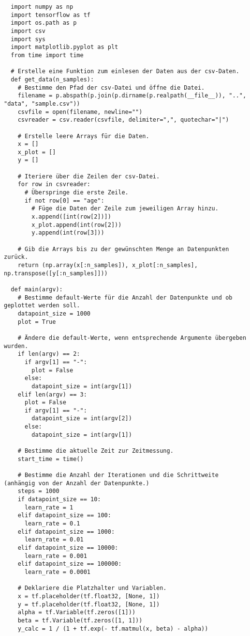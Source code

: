 \begin{verbatim}
  import numpy as np
  import tensorflow as tf
  import os.path as p
  import csv
  import sys
  import matplotlib.pyplot as plt
  from time import time

  # Erstelle eine Funktion zum einlesen der Daten aus der csv-Daten.
  def get_data(n_samples):
    # Bestimme den Pfad der csv-Datei und öffne die Datei.
    filename = p.abspath(p.join(p.dirname(p.realpath(__file__)), "..", "data", "sample.csv"))
    csvfile = open(filename, newline="")
    csvreader = csv.reader(csvfile, delimiter=",", quotechar="|")

    # Erstelle leere Arrays für die Daten.
    x = []
    x_plot = []
    y = []

    # Iteriere über die Zeilen der csv-Datei.
    for row in csvreader:
      # Überspringe die erste Zeile.
      if not row[0] == "age":
        # Füge die Daten der Zeile zum jeweiligen Array hinzu.
        x.append([int(row[2])])
        x_plot.append(int(row[2]))
        y.append(int(row[3]))

    # Gib die Arrays bis zu der gewünschten Menge an Datenpunkten zurück.
    return (np.array(x[:n_samples]), x_plot[:n_samples], np.transpose([y[:n_samples]]))

  def main(argv):
    # Bestimme default-Werte für die Anzahl der Datenpunkte und ob geplottet werden soll.
    datapoint_size = 1000
    plot = True

    # Ändere die default-Werte, wenn entsprechende Argumente übergeben wurden.
    if len(argv) == 2:
      if argv[1] == "-":
        plot = False
      else:
        datapoint_size = int(argv[1])
    elif len(argv) == 3:
      plot = False
      if argv[1] == "-":
        datapoint_size = int(argv[2])
      else:
        datapoint_size = int(argv[1])

    # Bestimme die aktuelle Zeit zur Zeitmessung.
    start_time = time()

    # Bestimme die Anzahl der Iterationen und die Schrittweite (anhängig von der Anzahl der Datenpunkte.)
    steps = 1000
    if datapoint_size == 10:
      learn_rate = 1
    elif datapoint_size == 100:
      learn_rate = 0.1
    elif datapoint_size == 1000:
      learn_rate = 0.01
    elif datapoint_size == 10000:
      learn_rate = 0.001
    elif datapoint_size == 100000:
      learn_rate = 0.0001

    # Deklariere die Platzhalter und Variablen.
    x = tf.placeholder(tf.float32, [None, 1])
    y = tf.placeholder(tf.float32, [None, 1])
    alpha = tf.Variable(tf.zeros([1]))
    beta = tf.Variable(tf.zeros([1, 1]))
    y_calc = 1 / (1 + tf.exp(- tf.matmul(x, beta) - alpha))


\end{verbatim}
